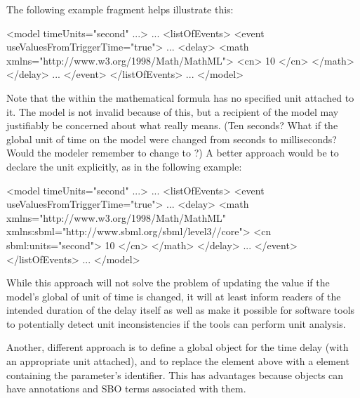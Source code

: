 The following \Event example fragment helps illustrate this:
\label{sec:event:delay:example}

\vspace*{0.5ex}
\begin{example}
<model timeUnits="second" ...>
    ...
    <listOfEvents>
        <event useValuesFromTriggerTime="true">
            ...
            <delay>
                <math xmlns="http://www.w3.org/1998/Math/MathML">
                    <cn> 10 </cn>
                </math>
            </delay>
            ...
        </event>
    </listOfEvents>
    ...
</model>
\end{example}
\vspace*{1ex}

Note that the  within the mathematical formula
has no specified unit attached to it.  The model is not invalid
because of this, but a recipient of the model may justifiably be
concerned about what  really means.  (Ten seconds?  What
if the global unit of time on the model were changed from seconds
to milliseconds?  Would the modeler remember to change  to
?)  A better approach would be to declare the unit
explicitly, as in the following example:

\vspace*{1ex}
\begin{example}
<model timeUnits="second" ...>
    ...
    <listOfEvents>
        <event useValuesFromTriggerTime="true">
            ...
            <delay>
                <math xmlns="http://www.w3.org/1998/Math/MathML"
                      xmlns:sbml="http://www.sbml.org/sbml/level3/\thisvlc/core">
                    <cn sbml:units="second"> 10 </cn>
                </math>
            </delay>
            ...
        </event>
    </listOfEvents>
    ...
</model>
\end{example}
\vspace*{1ex}

While this approach will not solve the problem of updating the
value if the model's global of unit of time is changed, it will at
least inform readers of the intended duration of the delay itself
as well as make it possible for software tools to potentially
detect unit inconsistencies if the tools can perform unit
analysis.

Another, different approach is to define a global \Parameter
object for the time delay (with an appropriate unit attached), and
to replace the  element above with a  element
containing the parameter's identifier.  This has advantages
because \Parameter objects can have annotations and SBO terms
associated with them.


